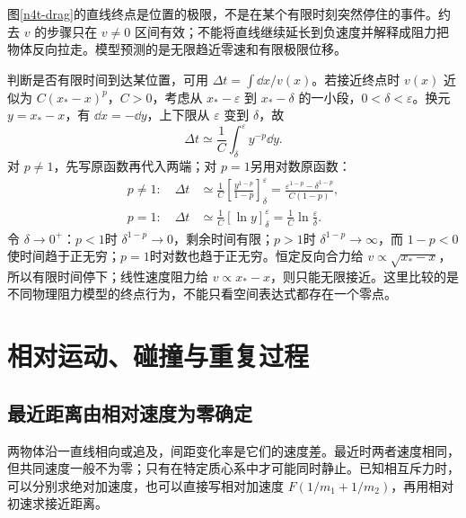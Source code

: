 图\ref{n4t-drag}的直线终点是位置的极限，不是在某个有限时刻突然停住的事件。约去 $v$ 的步骤只在 $v\ne0$ 区间有效；不能将直线继续延长到负速度并解释成阻力把物体反向拉走。模型预测的是无限趋近零速和有限极限位移。

判断是否有限时间到达某位置，可用 $\Delta t=\int\dd x/v(x)$。若接近终点时 $v(x)$ 近似为 $C(x_*-x)^p$，$C>0$，考虑从 $x_*-\varepsilon$ 到 $x_*-\delta$ 的一小段，$0<\delta<\varepsilon$。换元 $y=x_*-x$，有 $\dd x=-\dd y$，上下限从 $\varepsilon$ 变到 $\delta$，故
\[
\Delta t\simeq\frac1C\int_\delta^\varepsilon y^{-p}\dd y.
\]
对 $p\ne1$，先写原函数再代入两端；对 $p=1$另用对数原函数：
\begin{align*}
 p\ne1:\quad\Delta t&\simeq\frac1C
 \left[\frac{y^{1-p}}{1-p}\right]_\delta^\varepsilon
 =\frac{\varepsilon^{1-p}-\delta^{1-p}}{C(1-p)},\\
 p=1:\quad\Delta t&\simeq\frac1C[\ln y]_\delta^\varepsilon
 =\frac1C\ln\frac\varepsilon\delta.
\end{align*}
令 $\delta\to0^+$：$p<1$时 $\delta^{1-p}\to0$，剩余时间有限；$p>1$时 $\delta^{1-p}\to\infty$，而 $1-p<0$使时间趋于正无穷；$p=1$时对数也趋于正无穷。恒定反向合力给 $v\propto\sqrt{x_*-x}$，所以有限时间停下；线性速度阻力给 $v\propto x_*-x$，则只能无限接近。这里比较的是不同物理阻力模型的终点行为，不能只看空间表达式都存在一个零点。

\section{相对运动、碰撞与重复过程}
\subsection{最近距离由相对速度为零确定}
两物体沿一直线相向或追及，间距变化率是它们的速度差。最近时两者速度相同，但共同速度一般不为零；只有在特定质心系中才可能同时静止。已知相互斥力时，可以分别求绝对加速度，也可以直接写相对加速度 $F(1/m_1+1/m_2)$，再用相对初速求接近距离。

